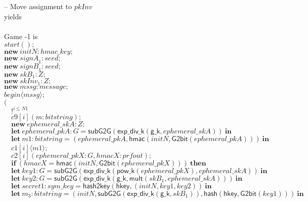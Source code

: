 \documentclass{article}
\newcommand{\cinput}[2]{{#1}({#2})}
\newcommand{\coutput}[2]{\overline{#1}\langle{#2}\rangle}
\newcommand{\kw}[1]{\mathbf{#1}}
\newcommand{\kwf}[1]{\mathsf{#1}}
\newcommand{\var}[1]{\mathit{#1}}
\newcommand{\kwt}[1]{\mathit{#1}}
\newcommand{\kwp}[1]{\mathit{#1}}
\newcommand{\kwc}[1]{\mathit{#1}}
\begin{document}
\begin{tabbing}
\quad -- Move assignment to $\var{pkInv}$\\
yields\\
\\
Game -1 is\\
\>$\cinput{\kwc{start}}{};$\\
\>$\kw{new}\ \var{initN}: \kwt{hmac{\_}key};$\\
\>$\kw{new}\ \var{signA}_{1}: \kwt{seed};$\\
\>$\kw{new}\ \var{signB}_{1}: \kwt{seed};$\\
\>$\kw{new}\ \var{skB}_{1}: \kwt{Z};$\\
\>$\kw{new}\ \var{skInv}_{1}: \kwt{Z};$\\
\>$\kw{new}\ \var{mssg}: \kwt{message};$\\
\>$\coutput{\kwc{begin}}{\var{mssg}};$\\
\>$($\\
\>$\quad !^{\var{i} \leq \kwp{N1}}$\\
\>$\quad \cinput{\kwc{c9}[\var{i}]}{\var{m}: \kwt{bitstring}};$\\
\>$\quad \kw{new}\ \var{ephemeral{\_}skA}: \kwt{Z};$\\
\>$\quad \kw{let}\ \var{ephemeral{\_}pkA}: \kwt{G} = \kwf{subG2G}(\kwf{exp{\_}div{\_}k}(\kwf{g{\_}k}, \var{ephemeral{\_}skA}))\ \kw{in}$\\
\>$\quad \kw{let}\ \var{m1}: \kwt{bitstring} = \kwf{}(\var{ephemeral{\_}pkA}, \kwf{hmac}(\var{initN}, \kwf{G2bit}(\var{ephemeral{\_}pkA})))\ \kw{in}$\\
\>$\quad \coutput{\kwc{c1}[\var{i}]}{\var{m1}};$\\
\>$\quad \cinput{\kwc{c2}[\var{i}]}{\var{ephemeral{\_}pkX}: \kwt{G}, \var{hmacX}: \kwt{prfout}};$\\
\>$\quad \kw{if}\ (\var{hmacX}  =  \kwf{hmac}(\var{initN}, \kwf{G2bit}(\var{ephemeral{\_}pkX})))\ \kw{then}$\\
\>$\quad \kw{let}\ \var{key1}: \kwt{G} = \kwf{subG2G}(\kwf{exp{\_}div{\_}k}(\kwf{pow{\_}k}(\var{ephemeral{\_}pkX}), \var{ephemeral{\_}skA}))\ \kw{in}$\\
\>$\quad \kw{let}\ \var{key2}: \kwt{G} = \kwf{subG2G}(\kwf{exp{\_}div{\_}k}(\kwf{g{\_}k}, \kwf{mult}(\var{skB}_{1}, \var{ephemeral{\_}skA})))\ \kw{in}$\\
\>$\quad \kw{let}\ \var{secret1}: \kwt{sym{\_}key} = \kwf{hash2key}(\kwf{hkey}, \kwf{}(\var{initN}, \var{key1}, \var{key2}))\ \kw{in}$\\
\>$\quad \kw{let}\ \var{m}_{3}: \kwt{bitstring} = \kwf{}(\var{initN}, \kwf{subG2G}(\kwf{exp{\_}div{\_}k}(\kwf{g{\_}k}, \var{skB}_{1})), \kwf{hash}(\kwf{hkey}, \kwf{G2bit}(\var{key1})))\ \kw{in}$\\

\end{tabbing}
\end{document}
